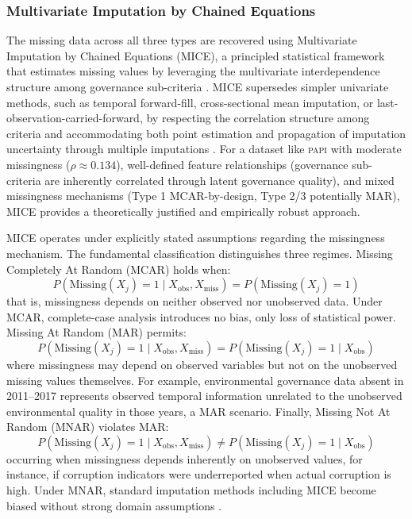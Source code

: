 \documentclass[12pt,a4paper]{article}
\newcommand{\PAPI}{\textsc{papi}\xspace}
\begin{document}
\subsubsection{Multivariate Imputation by Chained Equations}

The missing data across all three types are recovered using Multivariate Imputation by Chained Equations (MICE), a principled statistical framework that estimates missing values by leveraging the multivariate interdependence structure among governance sub-criteria \citep{Rubin1987, vanBuuren2018}. MICE supersedes simpler univariate methods, such as temporal forward-fill, cross-sectional mean imputation, or last-observation-carried-forward, by respecting the correlation structure among criteria and accommodating both point estimation and propagation of imputation uncertainty through multiple imputations \citep{vanBuuren2018}. For a dataset like \PAPI with moderate missingness ($\rho \approx 0.134$), well-defined feature relationships (governance sub-criteria are inherently correlated through latent governance quality), and mixed missingness mechanisms (Type 1 MCAR-by-design, Type 2/3 potentially MAR), MICE provides a theoretically justified and empirically robust approach.

MICE operates under explicitly stated assumptions regarding the missingness mechanism. The fundamental classification distinguishes three regimes. Missing Completely At Random (MCAR) holds when:
\begin{equation}
\label{eq:mcar}
P(\text{Missing}(X_j) = 1 \mid X_{\text{obs}}, X_{\text{miss}}) = P(\text{Missing}(X_j) = 1)
\end{equation}
that is, missingness depends on neither observed nor unobserved data. Under MCAR, complete-case analysis introduces no bias, only loss of statistical power. Missing At Random (MAR) permits:
\begin{equation}
\label{eq:mar}
P(\text{Missing}(X_j) = 1 \mid X_{\text{obs}}, X_{\text{miss}}) = P(\text{Missing}(X_j) = 1 \mid X_{\text{obs}})
\end{equation}
where missingness may depend on observed variables but not on the unobserved missing values themselves. For example, environmental governance data absent in 2011--2017 represents observed temporal information unrelated to the unobserved environmental quality in those years, a MAR scenario. Finally, Missing Not At Random (MNAR) violates MAR:
\begin{equation}
\label{eq:mnar}
P(\text{Missing}(X_j) = 1 \mid X_{\text{obs}}, X_{\text{miss}}) \neq P(\text{Missing}(X_j) = 1 \mid X_{\text{obs}})
\end{equation}
occurring when missingness depends inherently on unobserved values, for instance, if corruption indicators were underreported when actual corruption is high. Under MNAR, standard imputation methods including MICE become biased without strong domain assumptions \citep{vanBuuren2018}.
\end{document}
